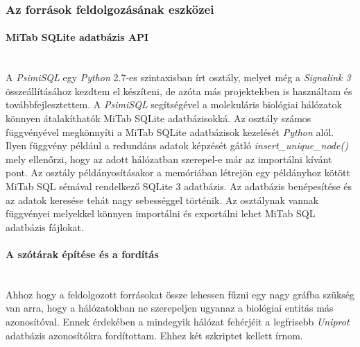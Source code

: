 \documentclass[a4paper,12pt]{article}
\begin{document}
		\subsubsection{Az források feldolgozásának eszközei}
		
			\paragraph{MiTab SQLite adatbázis API} \mbox{}\\
			A \textit{PsimiSQL} egy \textit{Python} 2.7-es szintaxisban írt osztály, melyet még a \textit{Signalink 3} összeállításához kezdtem el készíteni, de azóta más projektekben is használtam és továbbfejlesztettem. A \textit{PsimiSQL} segítségével a molekuláris biológiai hálózatok könnyen átalakíthatók MiTab SQLite adatbázisokká. Az osztály számos függvényével megkönnyíti a MiTab SQLite adatbázisok kezelését \textit{Python} alól. Ilyen függvény például a redundáns adatok képzését gátló \textit{insert\_unique\_node()} mely ellenőrzi, hogy az adott hálózatban szerepel-e már az importálni kívánt pont. Az osztály példányosításakor a memóriában létrejön egy példányhoz kötött MiTab SQL sémával rendelkező SQLite 3 adatbázis. Az adatbázis benépesítése és az adatok keresése tehát nagy sebességgel történik. Az osztálynak vannak függvényei melyekkel könnyen importálni és exportálni lehet MiTab SQL adatbázis fájlokat.
			
			\paragraph{A szótárak építése és a fordítás} \mbox{}\\
			Ahhoz hogy a feldolgozott forrásokat össze lehessen fűzni egy nagy gráfba szükség van arra, hogy a hálózatokban ne szerepeljen ugyanaz a biológiai entitás más azonosítóval. Ennek érdekében a mindegyik hálózat fehérjéit a legfrisebb \textit{Uniprot} adatbázis azonosítókra fordítottam. Ehhez két szkriptet kellett írnom. 
			
\end{document}
